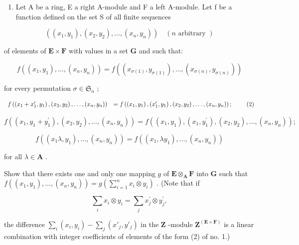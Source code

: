\BourbakiExercisesSection

\begin{enumerate}
\def\labelenumi{\arabic{enumi}.}
\tightlist
\item
  Let A be a ring, E a right A-module and F a left A-module. Let f be a function defined on the set S of all finite sequences
\end{enumerate}

\[
((x _ {1}, y _ {1}), (x _ {2}, y _ {2}), \dots , (x _ {n}, y _ {n})) \quad (n \text {   arbitrary })
\]

of elements of \(\mathbf{E} \times \mathbf{F}\) with values in a set \(\mathbf{G}\) and such that:

\[
f ((x _ {1}, y _ {1}), \dots , (x _ {n}, y _ {n})) = f ((x _ {\sigma (1)}, y _ {\sigma (1)}), \dots , (x _ {\sigma (n)}, y _ {\sigma (n)}))\tag{1}
\]

for every permutation \(\sigma \in \mathfrak{S}_n\) ;

\[
\begin{array}{r l} f \left(\left(x _ {1} + x _ {1} ^ {\prime}, y _ {1}\right), \left(x _ {2}, y _ {2}\right), \dots , \left(x _ {n}, y _ {n}\right)\right) & = f \left(\left(x _ {1}, y _ {1}\right), \left(x _ {1} ^ {\prime}, y _ {1}\right), \left(x _ {2}, y _ {2}\right), \dots , \left(x _ {n}, y _ {n}\right)\right); \end{array} \tag {2}
\]

\[
f ((x _ {1}, y _ {1} + y _ {1} ^ {\prime}), (x _ {2}, y _ {2}), \dots , (x _ {n}, y _ {n})) = f ((x _ {1}, y _ {1}), (x _ {1}, y _ {1} ^ {\prime}), (x _ {2}, y _ {2}), \dots , (x _ {n}, y _ {n}));\tag{3}
\]

\[
f ((x _ {1} \lambda , y _ {1}), \dots , (x _ {n}, y _ {n})) = f ((x _ {1}, \lambda y _ {1}), \dots , (x _ {n}, y _ {n}))\tag{4}
\]

for all \(\lambda \in \mathbf{A}\) .

Show that there exists one and only one mapping \(g\) of \(\mathbf{E} \otimes_{\mathbf{A}} \mathbf{F}\) into \(\mathbf{G}\) such that \(f((x_1, y_1), \ldots, (x_n, y_n)) = g\left(\sum_{i=1}^{n} x_i \otimes y_i\right)\) . (Note that if

\[
\sum_ {i} x _ {i} \otimes y _ {i} = \sum_ {j} x _ {j} ^ {\prime} \otimes y _ {j} ^ {\prime},
\]

the difference \(\sum_{i}(x_i, y_i) - \sum_j(x'_j, y'_j)\) in the \(\mathbf{Z}\) -module \(\mathbf{Z}^{(\mathbf{E} \times \mathbf{F})}\) is a linear combination with integer coefficients of elements of the form (2) of no. 1.)

